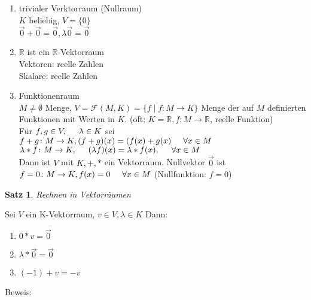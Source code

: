 \documentclass[a4paper,11pt]{article}
\newtheorem{satz}[definition]{Satz}
\begin{document}
\begin{enumerate}[label=\alph*)]
\item trivialer Verktorraum (Nullraum) \\
$K$ beliebig, $V=\{0\}$ \\
$\overset{\rightarrow}{0}+\overset{\rightarrow}{0}=\overset{\rightarrow}{0}, \lambda\overset{\rightarrow}{0}=\overset{\rightarrow}{0}$
\item $\mathbb{R}$ ist ein $\mathbb{R}$-Vektorraum \\
Vektoren: reelle Zahlen \\
Skalare: reelle Zahlen
\item Funktionenraum \\
$M\neq\emptyset$ Menge, $V=\mathscr{F}(M,K)=\{f\mid f\colon M\rightarrow K\}$ Menge der auf $M$ definierten Funktionen mit Werten in $K$. (oft: $K=\mathbb{R},f\colon M\rightarrow\mathbb{R}$, reelle Funktion) \\
Für $f,g\in V,\hspace{5mm}\lambda\in K$ sei $f+g\colon M\rightarrow K, (f+g)(x)=(f(x)+g(x)\hspace{5mm}\forall x\in M$ \\
$\lambda*f\colon M\rightarrow K,\hspace{5mm}(\lambda f)(x)=\lambda*f(x),\hspace{5mm}\forall x\in M$ \\
Dann ist $V$ mit $K,+,*$ ein Vektorraum. Nullvektor $\overset{\rightarrow}{0}$ ist $f=0\colon M\rightarrow K, f(x)=0\\
\hspace{5mm}\forall x\in M$ (Nullfunktion: $f=0$)
\end{enumerate}
\begin{satz}
Rechnen in Vektorräumen
\end{satz}
Sei $V$ ein K-Vektorraum, $v\in V, \lambda\in K$ Dann:
\begin{enumerate}[label=\alph*)]
\vspace{-3mm}
\item $0*v=\overset{\rightarrow}{0}$
\item $\lambda*\overset{\rightarrow}{0}=\overset{\rightarrow}{0}$
\item $(-1)+v=-v$
\end{enumerate}
Beweis: \\
\end{document}
